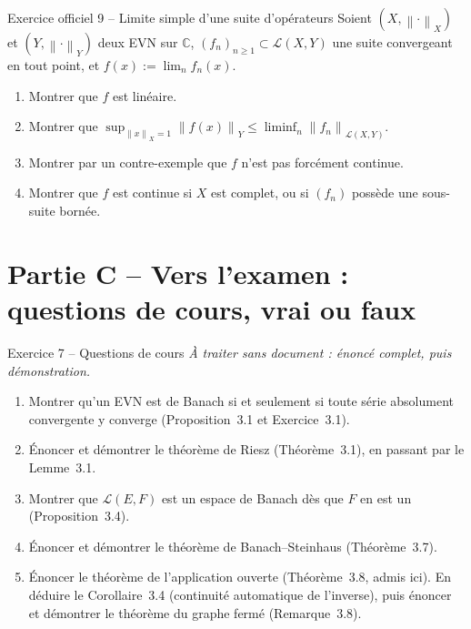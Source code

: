 \documentclass[11pt,a4paper]{article}
\newcommand{\C}{\mathbb{C}}
\newcommand{\norm}[1]{\left\|#1\right\|}
\newcommand{\Lc}{\mathcal{L}}
\theoremstyle{definition}
\begin{document}
\begin{exo}{Exercice officiel 9 -- Limite simple d'une suite d'opérateurs}
Soient $(X,\norm\cdot_X)$ et $(Y,\norm\cdot_Y)$ deux EVN sur $\C$, $(f_n)_{n\ge1}\subset\Lc(X,Y)$ une suite convergeant en tout point, et $f(x):=\lim_nf_n(x)$.
\begin{enumerate}[label=(\alph*)]
  \item Montrer que $f$ est linéaire.
  \item Montrer que $\sup_{\norm x_X=1}\norm{f(x)}_Y\le\liminf_n\norm{f_n}_{\Lc(X,Y)}$.
  \item Montrer par un contre-exemple que $f$ n'est pas forcément continue.
  \item Montrer que $f$ est continue si $X$ est complet, ou si $(f_n)$ possède une sous-suite bornée.
\end{enumerate}
\end{exo}

\section*{Partie C -- Vers l'examen : questions de cours, vrai ou faux}

\begin{exo}{Exercice 7 -- Questions de cours}
\emph{À traiter sans document : énoncé complet, puis démonstration.}
\begin{enumerate}[label=(\alph*)]
  \item Montrer qu'un EVN est de Banach si et seulement si toute série absolument convergente y converge (Proposition~3.1 et Exercice~3.1).
  \item Énoncer et démontrer le théorème de Riesz (Théorème~3.1), en passant par le Lemme~3.1.
  \item Montrer que $\Lc(E,F)$ est un espace de Banach dès que $F$ en est un (Proposition~3.4).
  \item Énoncer et démontrer le théorème de Banach--Steinhaus (Théorème~3.7).
  \item Énoncer le théorème de l'application ouverte (Théorème~3.8, admis ici). En déduire le Corollaire~3.4 (continuité automatique de l'inverse), puis énoncer et démontrer le théorème du graphe fermé (Remarque~3.8).
\end{enumerate}
\end{exo}
\end{document}

